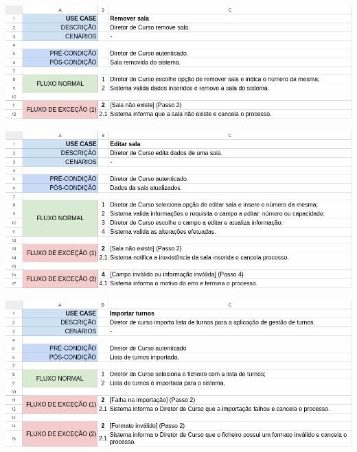 \documentclass[a4paper,12pt]{scrreprt}
\begin{document}
\begin{minipage}{\textwidth}
    \centering
    \includegraphics[width=1\textwidth]{images/use-cases/descriptions/17-Remover sala.png}
    \label{fig:3-17-remover_sala}
\end{minipage}

\begin{minipage}{\textwidth}
    \centering
    \includegraphics[width=1\textwidth]{images/use-cases/descriptions/18-Editar sala.png}
    \label{fig:3-18-editar_sala}
\end{minipage}

\begin{minipage}{\textwidth}
    \centering
    \includegraphics[width=1\textwidth]{images/use-cases/descriptions/19-Importar turnos.png}
    \label{fig:3-19-importar_turnos}
\end{minipage}
\end{document}
